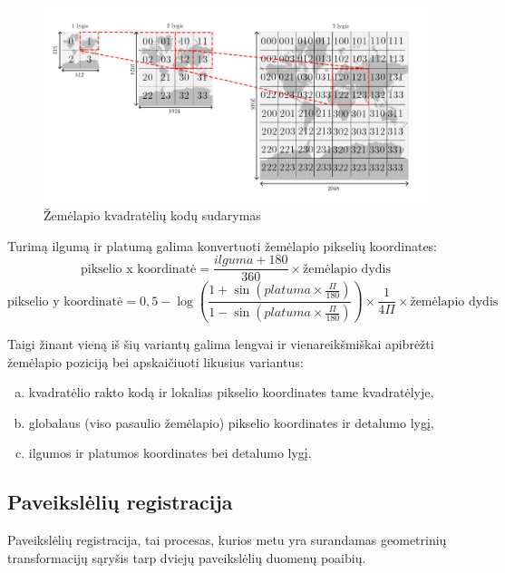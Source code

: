 \documentclass[a4paper,12pt]{article}
\begin{document}
			\begin{figure}[h]
				\includegraphics[width=\textwidth]{images/MapZooming.png}
				\caption{Žemėlapio kvadratėlių kodų sudarymas}
				\label{fig:quadkey}
			\end{figure}
			
			Turimą ilgumą ir platumą galima konvertuoti žemėlapio pikselių koordinates:	
			\begin{equation}
			\text{pikselio x koordinatė} = \frac{ilguma + 180}{360} \times \text{žemėlapio dydis}
			\end{equation}	
			\begin{equation}	
			\text{pikselio y koordinatė} = 0,5 - \log \left(\frac{1+\sin \left(platuma \times \frac{\Pi}{180}\right)}{1-\sin \left(platuma \times \frac{\Pi}{180}\right)}\right) \times \frac{1}{4\Pi} \times \text{žemėlapio dydis}
			\end{equation}	
						
			Taigi žinant vieną iš šių variantų	galima lengvai ir vienareikšmiškai apibrėžti žemėlapio poziciją bei apskaičiuoti likusius variantus:
			\begin{enumerate}[(a)]
				\item kvadratėlio rakto kodą ir lokalias pikselio koordinates tame kvadratėlyje,
				\item globalaus (viso pasaulio žemėlapio) pikselio koordinates ir detalumo lygį,
				\item ilgumos ir platumos koordinates bei detalumo lygį.
			\end{enumerate}	
		
	\subsection{Paveikslėlių registracija}
		\label{sec:ImageRegistration}
		Paveikslėlių registracija, tai procesas, kurios metu yra surandamas geometrinių transformacijų sąryšis tarp dviejų paveikslėlių duomenų poaibių.
	
\end{document}
